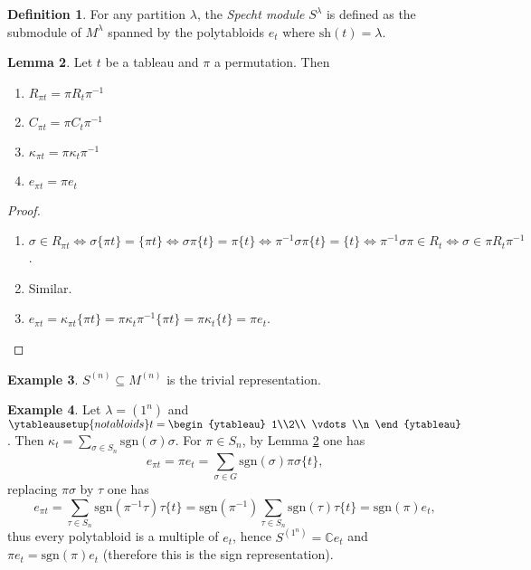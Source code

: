 \documentclass{article}
\newcommand{\sgn}{\text{sgn}}
\newcommand{\C}{\mathbb{C}}
\newcommand{\sh}{\text{sh}}
\theoremstyle{definition}
\newtheorem{defn}{Definition}[subsection]
\newtheorem{lemma}[defn]{Lemma}
\newtheorem{example}[defn]{Example}
\begin{document}
\begin{defn}
For any partition $\lambda$, the \textit{Specht module} $S^\lambda$ is defined as the submodule of $M^\lambda$ spanned by the polytabloids $e_t$ where $\sh(t)=\lambda$.
\end{defn}

\begin{lemma}
\label{lemma:tabpermformulae}
Let $t$ be a tableau and $\pi$ a permutation. Then
\begin{enumerate}
\item $R_{\pi t}=\pi R_t \pi^{-1}$
\item $C_{\pi t}=\pi C_t \pi^{-1}$
\item $\kappa_{\pi t}=\pi\kappa_t \pi^{-1}$
\item $e_{\pi t}=\pi e_t$
\end{enumerate}
\end{lemma}
\begin{proof}
\begin{enumerate}
\item $\sigma\in R_{\pi t}\iff\sigma\{\pi t\}=\{\pi t\}\iff\sigma\pi\{t\}=\pi\{t\}\iff\pi^{-1}\sigma\pi\{t\}=\{t\}\iff\pi^{-1}\sigma\pi\in R_t\iff \sigma\in\pi R_t\pi^{-1}$.
\item[2, 3.] Similar.
\item[4.] $e_{\pi t}=\kappa_{\pi t}\{\pi t\}=\pi\kappa_t\pi^{-1}\{\pi t\}=\pi\kappa_t\{t\}=\pi e_t$.
\end{enumerate}
\end{proof}

\begin{example}
$S^{(n)}\subseteq M^{(n)}$ is the trivial representation.
\end{example}

\begin{example}
\label{example:1colsignrep}
Let $\lambda=(1^n)$ and $\ytableausetup{notabloids} t=\begin{ytableau}
1\\2\\ \vdots\\n
\end{ytableau}$. Then $\kappa_t=\sum_{\sigma\in S_n}\sgn(\sigma)\sigma$. For $\pi\in S_n$, by Lemma \ref{lemma:tabpermformulae} one has
\[
e_{\pi t}=\pi e_t=\sum_{\sigma\in G}\sgn(\sigma)\pi\sigma\{t\},
\]
replacing $\pi\sigma$ by $\tau$ one has
\[
e_{\pi t}=\sum_{\tau\in S_n} \sgn(\pi^{-1}\tau)\tau\{t\}=\sgn(\pi^{-1})\sum_{\tau\in S_n}\sgn(\tau)\tau\{t\}=\sgn(\pi)e_t,
\]
thus every polytabloid is a multiple of $e_t$, hence $S^{(1^n)}=\C e_t$ and $\pi e_t=\sgn(\pi)e_t$ (therefore this is the sign representation).
\end{example}
\end{document}
